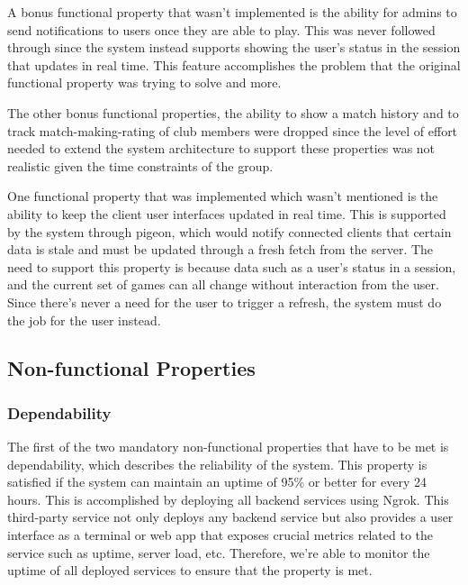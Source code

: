 \documentclass{article}
\begin{document}
A bonus functional property that wasn't implemented is the ability for admins to send notifications to users once they are able to play. This was never followed through since the system instead supports showing the user's status in the session that updates in real time. This feature accomplishes the problem that the original functional property was trying to solve and more.

The other bonus functional properties, the ability to show a match history and to track match-making-rating of club members were dropped since the level of effort needed to extend the system architecture to support these properties was not realistic given the time constraints of the group.

One functional property that was implemented which wasn't mentioned is the ability to keep the client user interfaces updated in real time. This is supported by the system through pigeon, which would notify connected clients that certain data is stale and must be updated through a fresh fetch from the server. The need to support this property is because data such as a user's status in a session, and the current set of games can all change without interaction from the user. Since there's never a need for the user to trigger a refresh, the system must do the job for the user instead.

\subsection{Non-functional Properties}
\subsubsection{Dependability}
The first of the two mandatory non-functional properties that have to be met is dependability, which describes the reliability of the system. This property is satisfied if the system can maintain an uptime of 95\% or better for every 24 hours. This is accomplished by deploying all backend services using Ngrok. This third-party service not only deploys any backend service but also provides a user interface as a terminal or web app that exposes crucial metrics related to the service such as uptime, server load, etc. Therefore, we're able to monitor the uptime of all deployed services to ensure that the property is met.
\end{document}
